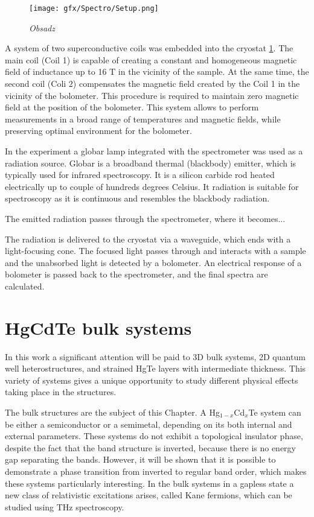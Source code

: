 \documentclass[titlepage,a4paper]{book}
\newcommand{\wciecie}{\quad\phantom{v}}
\begin{document}
\begin{figure}[ht]
	\centering
	\texttt{[image: gfx/Spectro/Setup.png]}
	\vspace{-10pt}
	\caption{\textit{Obsadz}}
	\label{fig:Experimental_setup}
\end{figure}

A system of two superconductive coils was embedded into the cryostat \ref{fig:Experimental_setup}. The main coil (Coil 1) is capable of creating a constant and homogeneous magnetic field of inductance up to 16 T in the vicinity of the sample. At the same time, the second coil (Coli 2) compensates the magnetic field created by the Coil 1 in the vicinity of the bolometer. This procedure is required to maintain zero magnetic field at the position of the bolometer. This system allows to perform measurements in a broad range of temperatures and magnetic fields, while preserving optimal environment for the bolometer.

In the experiment a globar lamp integrated with the spectrometer was used as a radiation source. Globar is a broadband thermal (blackbody) emitter, which is typically used for infrared spectroscopy. It is a silicon carbide rod heated electrically up to couple of hundreds degrees Celsius. It radiation is suitable for spectroscopy as it is continuous and resembles the blackbody radiation.

The emitted radiation passes through the spectrometer, where it becomes...


The radiation is delivered to the cryostat via a waveguide, which ends with a light-focusing cone. The focused light passes through and interacts with a sample and the unabsorbed light is detected by a bolometer. An electrical response of a bolometer is passed back to the spectrometer, and the final spectra are calculated.


\chapter{HgCdTe bulk systems}
\label{chpt:HgCdTe bulk systems}
\wciecie
In this work a significant attention will be paid to 3D bulk systems, 2D quantum well heterostructures, and strained HgTe layers with intermediate thickness. This variety of systems gives a unique opportunity to study different physical effects taking place in the structures. 

The bulk structures are the subject of this Chapter. A Hg$_{1-x}$Cd$_x$Te system can be either a semiconductor or a semimetal, depending on its both internal and external parameters. These systems do not exhibit a topological insulator phase, despite the fact that the band structure is inverted, because there is no energy gap separating the bands. However, it will be shown that it is possible to demonstrate a phase transition from inverted to regular band order, which makes these systems particularly interesting. In the bulk systems in a gapless state a new class of relativistic excitations arises, called Kane fermions, which can be studied using THz spectroscopy.
\end{document}
